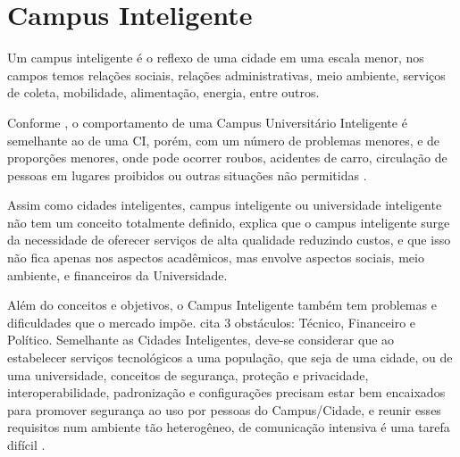 \section{Campus Inteligente}

Um campus inteligente é o reflexo de uma cidade em uma escala menor, nos campos temos relações sociais, relações administrativas, meio ambiente, serviços de coleta, mobilidade, alimentação, energia, entre outros.

Conforme , o comportamento de uma Campus Universitário Inteligente é semelhante ao de uma CI, porém, com um número de problemas menores, e de proporções menores, onde pode ocorrer roubos, acidentes de carro, circulação de pessoas em lugares proibidos ou outras situações não permitidas \cite{garay2018}.

Assim como cidades inteligentes, campus inteligente ou universidade inteligente não tem um conceito totalmente definido,  explica que o campus inteligente surge da necessidade de oferecer serviços de alta qualidade reduzindo custos, e que isso não fica apenas nos aspectos acadêmicos, mas envolve aspectos sociais, meio ambiente, e financeiros da Universidade.

Além do conceitos e objetivos, o Campus Inteligente também tem problemas e dificuldades que o mercado impõe. \cite{alghamdi} cita 3 obstáculos: Técnico, Financeiro e Político. Semelhante as Cidades Inteligentes, deve-se considerar que ao estabelecer serviços tecnológicos a uma população, que seja de uma cidade, ou de uma universidade, conceitos de segurança, proteção e privacidade, interoperabilidade, padronização e configurações precisam estar bem encaixados para promover segurança ao uso por pessoas do Campus/Cidade, e reunir esses requisitos num ambiente tão heterogêneo, de comunicação intensiva é uma tarefa difícil \cite{alghamdi}. 

